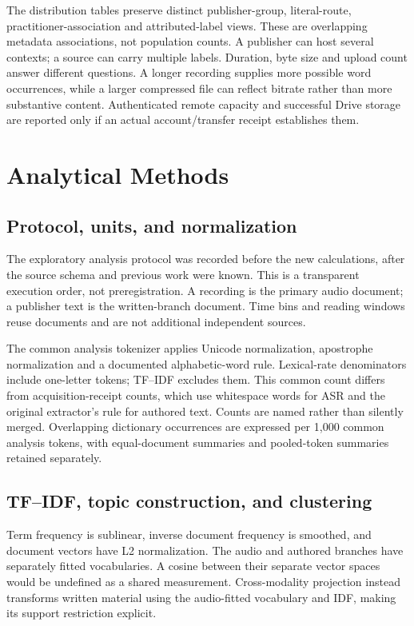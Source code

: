 The distribution tables preserve distinct publisher-group, literal-route, practitioner-association and attributed-label views. These are overlapping metadata associations, not population counts. A publisher can host several contexts; a source can carry multiple labels. Duration, byte size and upload count answer different questions. A longer recording supplies more possible word occurrences, while a larger compressed file can reflect bitrate rather than more substantive content. Authenticated remote capacity and successful Drive storage are reported only if an actual account/transfer receipt establishes them.

\section{Analytical Methods}
\subsection{Protocol, units, and normalization}
The exploratory analysis protocol was recorded before the new calculations, after the source schema and previous work were known. This is a transparent execution order, not preregistration. A recording is the primary audio document; a publisher text is the written-branch document. Time bins and reading windows reuse documents and are not additional independent sources.

The common analysis tokenizer applies Unicode normalization, apostrophe normalization and a documented alphabetic-word rule. Lexical-rate denominators include one-letter tokens; TF--IDF excludes them. This common count differs from acquisition-receipt counts, which use whitespace words for ASR and the original extractor's rule for authored text. Counts are named rather than silently merged. Overlapping dictionary occurrences are expressed per 1,000 common analysis tokens, with equal-document summaries and pooled-token summaries retained separately.



\subsection{TF--IDF, topic construction, and clustering}
Term frequency is sublinear, inverse document frequency is smoothed, and document vectors have L2 normalization. The audio and authored branches have separately fitted vocabularies. A cosine between their separate vector spaces would be undefined as a shared measurement. Cross-modality projection instead transforms written material using the audio-fitted vocabulary and IDF, making its support restriction explicit.

